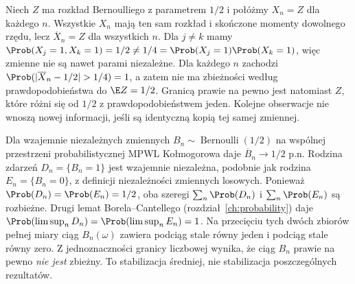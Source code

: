 \begin{przyklad}
Niech $Z$ ma rozkład Bernoulliego z parametrem $1/2$
i połóżmy $X_n=Z$ dla każdego $n$. Wszystkie $X_n$
mają ten sam rozkład i skończone momenty dowolnego
rzędu, lecz $\overline X_n=Z$ dla wszystkich $n$.
Dla $j\ne k$ mamy
$\Prob(X_j=1,X_k=1)=1/2\ne1/4
=\Prob(X_j=1)\Prob(X_k=1)$, więc zmienne nie są
nawet parami niezależne.
Dla każdego $n$ zachodzi
$\Prob(|\overline X_n-1/2|>1/4)=1$,
a zatem nie ma zbieżności według prawdopodobieństwa
do $\E Z=1/2$. Granicą prawie na pewno jest natomiast
$Z$, które różni się od $1/2$ z prawdopodobieństwem jeden.
Kolejne obserwacje nie wnoszą nowej informacji,
jeśli są identyczną kopią tej samej zmiennej.
\end{przyklad}

\begin{przyklad}
Dla wzajemnie niezależnych zmiennych
$B_n\sim\operatorname{Bernoulli}(1/2)$ na wspólnej
przestrzeni probabilistycznej MPWL Kołmogorowa daje
$\overline B_n\to1/2$ p.n.
Rodzina zdarzeń $D_n=\{B_n=1\}$ jest wzajemnie niezależna,
podobnie jak rodzina $E_n=\{B_n=0\}$, z definicji
niezależności zmiennych losowych. Ponieważ
$\Prob(D_n)=\Prob(E_n)=1/2$, oba szeregi
$\sum_n\Prob(D_n)$ i $\sum_n\Prob(E_n)$ są rozbieżne.
Drugi lemat Borela--Cantellego (rozdział~\ref{ch:probability})
daje $\Prob(\limsup_n D_n)=\Prob(\limsup_n E_n)=1$.
Na przecięciu tych dwóch zbiorów pełnej miary
ciąg $B_n(\omega)$ zawiera podciąg stale równy jeden
i podciąg stale równy zero. Z jednoznaczności granicy
liczbowej wynika, że ciąg $B_n$ prawie na pewno
\emph{nie jest} zbieżny.
To stabilizacja średniej, nie stabilizacja
poszczególnych rezultatów.
\end{przyklad}

